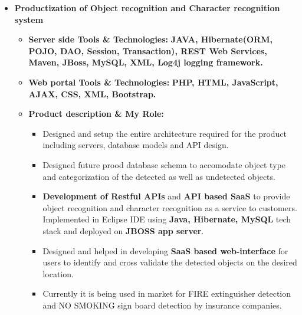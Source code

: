 \documentclass[11pt,letterpaper,sans]{moderncv}        %
\begin{document}
\begin{small}
\begin{itemize}
\vspace{5pt}

\pagebreak

\item \textbf{Productization of Object recognition and Character recognition system}
\vspace{2pt}
\begin{itemize}
\item \textbf{Server side Tools \& Technologies:} \textbf{JAVA, Hibernate(ORM, POJO, DAO, Session, Transaction), REST Web Services, Maven, JBoss, MySQL, XML, Log4j logging framework.}
\vspace{2pt}
\vspace{2pt}
\item \textbf{Web portal Tools \& Technologies:} \textbf{PHP, HTML, JavaScript, AJAX, CSS, XML, Bootstrap.}

\vspace{3pt}

\item \textbf{Product description \& My Role:}
\begin{itemize}
\item Designed and setup the entire architecture required for the product including servers, database models and API design.
\vspace{2pt}
\vspace{2pt}
\item Designed future prood database schema to accomodate object type and categorization of the detected as well as undetected objects.
\vspace{2pt}
\item \textbf{Development of Restful APIs} and \textbf{API based SaaS} to provide object recognition and character recognition as a service to customers. Implemented in Eclipse IDE using \textbf{Java, Hibernate, MySQL} tech stack and deployed on \textbf{JBOSS app server}.
\vspace{2pt}
\item Designed and helped in developing \textbf{SaaS based web-interface} for users to identify and cross validate the detected objects on the desired location.
\vspace{2pt}
\item Currently it is being used in market for FIRE extinguisher detection and NO SMOKING sign board detection by insurance companies.
\end{itemize}
\end{itemize}

\vspace{5pt}


\end{itemize}
\end{small}
\end{document}
